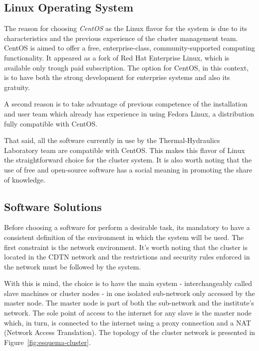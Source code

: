 \documentclass[twoside,a4paper,12pt,english]{inac17}
\begin{document}
\subsection{Linux Operating System}

The reason for choosing \textit{CentOS} as the Linux flavor for the system is due to its characteristics and the previous
experience of the cluster management team. CentOS is aimed to offer a free, enterprise-class, community-supported computing
functionality. It appeared as a fork of Red Hat Enterprise Linux, which is available only trough paid subscription. The option
for CentOS, in this context, is to have both the strong development for enterprise systems and also its gratuity.

A second reason is to take advantage of previous competence of the installation and user team which already has experience
in using Fedora Linux, a distribution fully compatible with CentOS.

That said, all the software currently in use by the Thermal-Hydraulics Laboratory team are compatible with CentOS. This
makes this flavor of Linux the straightforward choice for the cluster system. It is also worth noting that the use of
free and open-source software has a social meaning in promoting the share of knowledge.

\subsection{Software Solutions}
\label{sub:ssol}

Before choosing a software for perform a desirable task, its mandatory to have a consistent definition of the environment
in which the system will be used. The first constraint is the network environment. It's worth noting that the cluster is
located in the CDTN network and the restrictions and security rules enforced in the network must be followed by the system.

With this is mind, the choice is to have the main system - interchangeably called slave machines or cluster nodes - in one isolated sub-network only accessed by
the master node. The master node is part of both the sub-network and the institute's network. The sole point of access to the
internet for any slave is the master node which, in turn, is connected to the internet using a proxy connection and a
NAT (Network Access Translation). The topology of the cluster network is presented in Figure~\ref{fig:esquema-cluster}.
\end{document}
